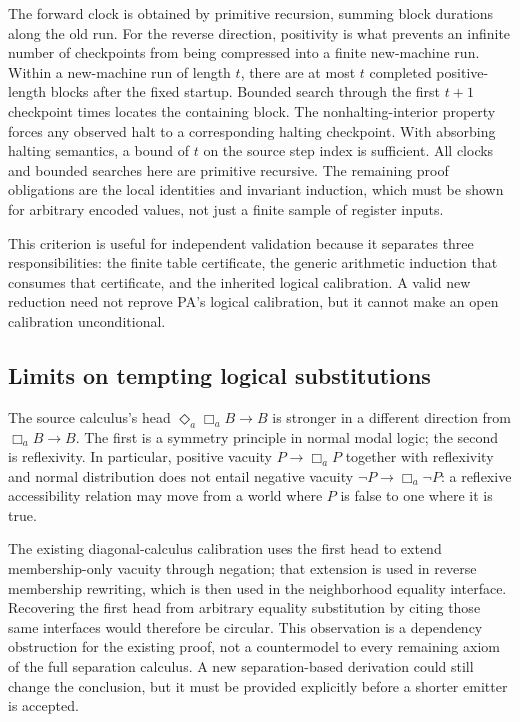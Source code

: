 The forward clock is obtained by primitive recursion, summing block
durations along the old run.  For the reverse direction, positivity is
what prevents an infinite number of checkpoints from being compressed
into a finite new-machine run.  Within a new-machine run of length $t$,
there are at most $t$ completed positive-length blocks after the fixed
startup.  Bounded search through the first $t+1$ checkpoint times locates
the containing block.  The nonhalting-interior property forces any
observed halt to a corresponding halting checkpoint.  With absorbing
halting semantics, a bound of $t$ on the source step index is sufficient.
All clocks and bounded searches here are primitive recursive.  The
remaining proof obligations are the local identities and invariant
induction, which must be shown for arbitrary encoded values, not just a
finite sample of register inputs.

This criterion is useful for independent validation because it separates
three responsibilities: the finite table certificate, the generic
arithmetic induction that consumes that certificate, and the inherited
logical calibration.  A valid new reduction need not reprove PA's
logical calibration, but it cannot make an open calibration unconditional.

\subsection{Limits on tempting logical substitutions}

The source calculus's head
$\Diamond_a\Box_a B\to B$ is stronger in a different direction from
$\Box_a B\to B$.  The first is a symmetry principle in normal modal
logic; the second is reflexivity.  In particular, positive vacuity
$P\to\Box_a P$ together with reflexivity and normal distribution does
not entail negative vacuity
$\neg P\to\Box_a\neg P$: a reflexive accessibility relation may move
from a world where $P$ is false to one where it is true.

The existing diagonal-calculus calibration uses the first head to extend
membership-only vacuity through negation; that extension is used in
reverse membership rewriting, which is then used in the neighborhood
equality interface.  Recovering the first head from arbitrary equality
substitution by citing those same interfaces would therefore be circular.
This observation is a dependency obstruction for the existing proof, not
a countermodel to every remaining axiom of the full separation calculus.
A new separation-based derivation could still change the conclusion, but
it must be provided explicitly before a shorter emitter is accepted.


